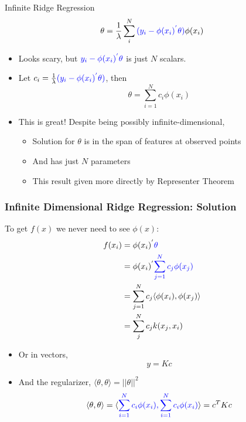 \documentclass{beamer}
\numberwithin{equation}{section}
\begin{document}
\begin{frame}{Infinite Ridge Regression}
\footnotesize
$$\theta = \frac{1}{\lambda}\sum_i^N {\color{blue}(y_i-\phi(x_i)^{'}\theta)} \phi(x_i)$$
\begin{itemize}
\item<2->Looks scary, but ${\color{blue}y_i-\phi(x_i)^{'} \theta}$ is just $N$ scalars.
\medskip
\item<3-> Let $c_i=\frac{1}{\lambda}{\color{blue}(y_i-\phi(x_i)^{'} \theta)}$, then
\scriptsize
\begin{equation}\label{eq:spanoffeatures}
       \theta = \sum_{i=1}^{N} c_i \phi(x_i)
\end{equation}

\item<4->[] \hspace{-.2in} \small This is great! Despite being possibly infinite-dimensional,
\begin{itemize}
\item<5-> \footnotesize Solution for $\theta$ is in the span of features at observed points
\item<6-> \footnotesize And has just $N$ parameters
\item<7-> \footnotesize This result given more directly by Representer Theorem
\end{itemize}
\end{itemize}
\end{frame}

\begin{frame}
\frametitle{Infinite Dimensional Ridge Regression: Solution}
\vspace{-.03in}
To get $f(x)$ we never need to see $\phi(x)$:
\pause
\footnotesize
\begin{align*}
 f(x_i) &= \phi(x_i)^{'} {\color{blue}\theta} \\
 &= \phi(x_i)^{'} {\color{blue}\sum_{j=1}^N c_j \phi(x_j)}\\
 &= \sum_{j=1}^N c_j \langle \phi(x_i),\phi(x_j) \rangle \\
 &= \sum_j^N c_j k(x_j,x_i)
\end{align*}

\begin{itemize}
\item<2-> Or in vectors, $$y=Kc$$
\item<3-> And the regularizer, $\langle \theta,\theta \rangle = ||\theta||^2$
$$\langle\theta,\theta\rangle=\langle {\color{blue}\sum_{i=1}^{N} c_i \phi(x_i),\sum_{i=1}^{N} c_i \phi(x_i)}\rangle=c^T K c$$
\end{itemize}

\end{frame}
\end{document}
